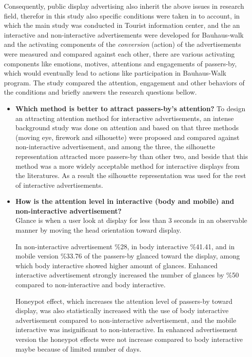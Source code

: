 Consequently, public display advertising also inherit the above issues in research field, therefor in this study also specific conditions were taken in to account, in which the main study was conducted in Tourist information center, and the an interactive and non-interactive advertisements were developed for Bauhaus-walk and the activating components of the \emph{conversion} (action) of the advertisements were measured and compared against each other, there are various activating components like emotions, motives, attentions and engagements of passers-by, which would eventually lead to actions like participation in Bauhaus-Walk program. The study compared the attention, engagement and other behaviors of the conditions and briefly answers the research questions bellow.




\begin{itemize}

\item \textbf{Which method is better to attract passers-by's attention?}
To design an attracting attention method for interactive advertisements, an intense background study was done on attention and based on that three methods (moving eye, firework and silhouette) were proposed and compared against non-interactive advertisement, and among the three, the silhouette representation attracted more passers-by than other two, and beside that this method was a more widely acceptable method for interactive displays from the literatures. As a result the silhouette representation was used for the rest of interactive advertisements.


\item \textbf{How is the attention level in interactive (body and mobile) and non-interactive advertisement?} \\
Glance is when a user look at display for less than 3 seconds in an observable manner by moving the head orientation toward display. 

In non-interactive advertisement \%28, in body interactive \%41.41, and in mobile version \%33.76 of the passers-by glanced toward the display, among which body interactive showed higher amount of glances. Enhanced interactive advertisement strongly increased the number of glances by \%50 compared to non-interactive and body interactive.

\iffalse
Honeypot effect, which increases the attention level of passers-by toward display, was also statistically increased with the use of body interactive advertisement compared to non-interactive advertisement, and the mobile interactive was insignificant to non-interactive. In enhanced advertisement version the honeypot effects were not increase compared to body interactive maybe because of limited number of days.


\end{itemize}
